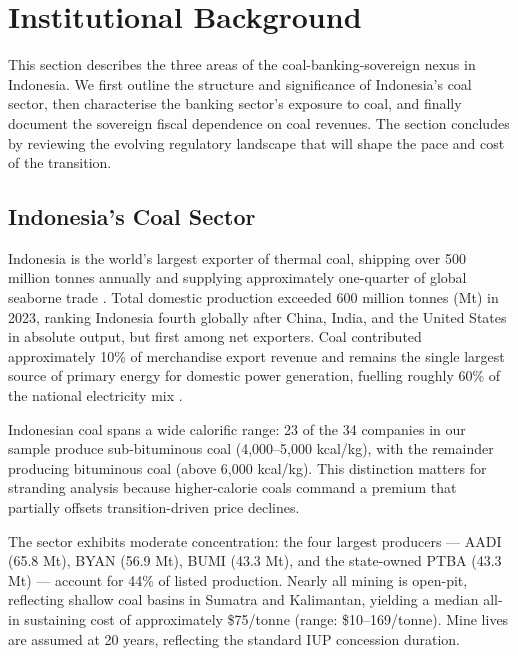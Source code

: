 
\section{Institutional Background}
\label{sec:background}

This section describes the three areas of the coal-banking-sovereign nexus in Indonesia. We first outline the structure and significance of Indonesia's coal sector, then characterise the banking sector's exposure to coal, and finally document the sovereign fiscal dependence on coal revenues. The section concludes by reviewing the evolving regulatory landscape that will shape the pace and cost of the transition.

\subsection{Indonesia's Coal Sector}
\label{subsec:coal_sector}

Indonesia is the world's largest exporter of thermal coal, shipping over 500 million tonnes annually and supplying approximately one-quarter of global seaborne trade \citep{IEA2024}. Total domestic production exceeded 600 million tonnes (Mt) in 2023, ranking Indonesia fourth globally after China, India, and the United States in absolute output, but first among net exporters. Coal contributed approximately 10\% of merchandise export revenue and remains the single largest source of primary energy for domestic power generation, fuelling roughly 60\% of the national electricity mix \citep{IESR2023}.

Indonesian coal spans a wide calorific range: 23 of the 34 companies in our sample produce sub-bituminous coal (4,000--5,000 kcal/kg), with the remainder producing bituminous coal (above 6,000 kcal/kg). This distinction matters for stranding analysis because higher-calorie coals command a premium that partially offsets transition-driven price declines.

The sector exhibits moderate concentration: the four largest producers --- AADI (65.8 Mt), BYAN (56.9 Mt), BUMI (43.3 Mt), and the state-owned PTBA (43.3 Mt) --- account for 44\% of listed production. Nearly all mining is open-pit, reflecting shallow coal basins in Sumatra and Kalimantan, yielding a median all-in sustaining cost of approximately \$75/tonne (range: \$10--169/tonne). Mine lives are assumed at 20 years, reflecting the standard IUP concession duration.

